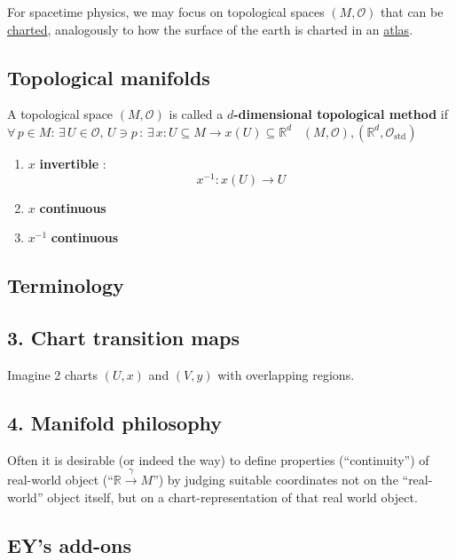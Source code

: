 For spacetime physics, we may focus on topological spaces $(M,\mathcal{O})$ that can be \underline{charted}, analogously to how the surface of the earth is charted in an \underline{atlas}.

\subsection{Topological manifolds}

\begin{definition}
	A topological space $(M,\mathcal{O})$ is called a \textbf{$d$-dimensional topological method} if \\
	$\forall \, p \in M : \, \exists \, U \in \mathcal{O}, \, U \ni p \, : \, \exists \, x : U \subseteq M \to x(U) \subseteq \mathbb{R}^d$  \quad \quad \, $(M,\mathcal{O}), ( \mathbb{R}^d , \mathcal{O}_{\text{std}})$ 
	\begin{enumerate}
		\item[(i)] $x$ \textbf{ invertible }: 
		\[
		x^{-1}:x(U) \to U
		\]
		\item[(ii)] $x$ \textbf{ continuous }
		\item[(iii)] $x^{-1}$ \textbf{ continuous }
	\end{enumerate}
\end{definition}

\subsection{Terminology}

\subsection{3. Chart transition maps}

Imagine 2 charts $(U,x)$ and $(V,y)$ with overlapping regions.  

\subsection{4. Manifold philosophy}

Often it is desirable (or indeed the way) to define properties (``continuity'') of real-world object (``$\mathbb{R}\xrightarrow{ \gamma } M$'') by judging suitable coordinates not on the ``real-world'' object itself, but on a chart-representation of that real world object.  

\subsection*{EY's add-ons}

